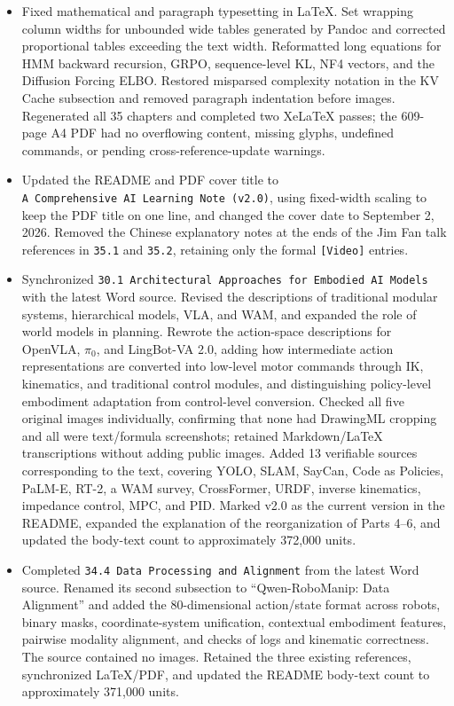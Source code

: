 \begin{itemize}
\item
  Fixed mathematical and paragraph typesetting in LaTeX. Set wrapping column widths for unbounded wide tables generated by Pandoc and corrected proportional tables exceeding the text width. Reformatted long equations for HMM backward recursion, GRPO, sequence-level KL, NF4 vectors, and the Diffusion Forcing ELBO. Restored misparsed complexity notation in the KV Cache subsection and removed paragraph indentation before images. Regenerated all 35 chapters and completed two XeLaTeX passes; the 609-page A4 PDF had no overflowing content, missing glyphs, undefined commands, or pending cross-reference-update warnings.
\item
  Updated the README and PDF cover title to \texttt{A\ Comprehensive\ AI\ Learning\ Note\ (v2.0)}, using fixed-width scaling to keep the PDF title on one line, and changed the cover date to September 2, 2026. Removed the Chinese explanatory notes at the ends of the Jim Fan talk references in \texttt{35.1} and \texttt{35.2}, retaining only the formal \texttt{{[}Video{]}} entries.
\item
  Synchronized \texttt{30.1\ Architectural\ Approaches\ for\ Embodied\ AI\ Models} with the latest Word source. Revised the descriptions of traditional modular systems, hierarchical models, VLA, and WAM, and expanded the role of world models in planning. Rewrote the action-space descriptions for OpenVLA, \(\pi_0\), and LingBot-VA 2.0, adding how intermediate action representations are converted into low-level motor commands through IK, kinematics, and traditional control modules, and distinguishing policy-level embodiment adaptation from control-level conversion. Checked all five original images individually, confirming that none had DrawingML cropping and all were text/formula screenshots; retained Markdown/LaTeX transcriptions without adding public images. Added 13 verifiable sources corresponding to the text, covering YOLO, SLAM, SayCan, Code as Policies, PaLM-E, RT-2, a WAM survey, CrossFormer, URDF, inverse kinematics, impedance control, MPC, and PID. Marked v2.0 as the current version in the README, expanded the explanation of the reorganization of Parts 4--6, and updated the body-text count to approximately 372,000 units.
\item
  Completed \texttt{34.4\ Data\ Processing\ and\ Alignment} from the latest Word source. Renamed its second subsection to ``Qwen-RoboManip: Data Alignment'' and added the 80-dimensional action/state format across robots, binary masks, coordinate-system unification, contextual embodiment features, pairwise modality alignment, and checks of logs and kinematic correctness. The source contained no images. Retained the three existing references, synchronized LaTeX/PDF, and updated the README body-text count to approximately 371,000 units.

\end{itemize}
